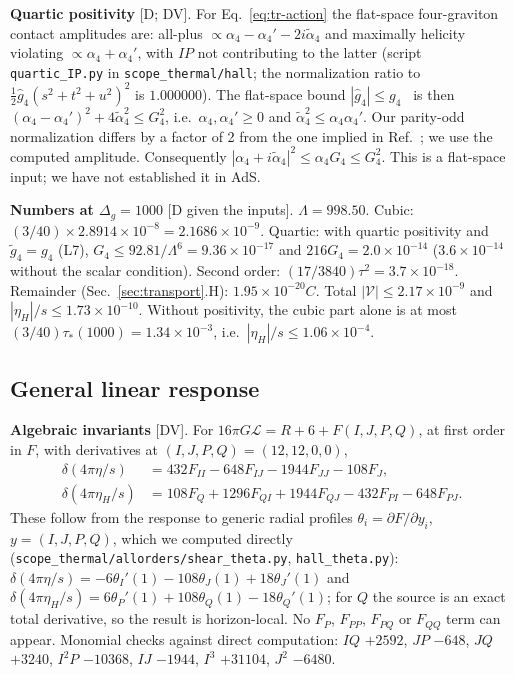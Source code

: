 \textbf{Quartic positivity} [D; DV]. For Eq.~\eqref{eq:tr-action} the flat-space four-graviton contact amplitudes are: all-plus
$\propto\alpha_4-\alpha_4'-2i\tilde\alpha_4$ and maximally helicity violating $\propto\alpha_4+\alpha_4'$, with $IP$ not
contributing to the latter (script \texttt{quartic\_IP.py} in \texttt{scope\_thermal/hall}; the normalization ratio to $\tfrac12\hat g_4(s^2+t^2+u^2)^2$
is $1.000000$). The flat-space bound $|\hat g_4|\le g_4$~\cite{CHLPS} is then $(\alpha_4-\alpha_4')^2+4\tilde\alpha_4^2\le G_4^2$,
i.e.\ $\alpha_4,\alpha_4'\ge0$ and $\tilde\alpha_4^2\le\alpha_4\alpha_4'$. Our parity-odd normalization differs by a factor of 2
from the one implied in Ref.~\cite{CHLPS}; we use the computed amplitude. Consequently $|\alpha_4+i\tilde\alpha_4|^2\le\alpha_4G_4\le G_4^2$.
This is a flat-space input; we have not established it in AdS.

\textbf{Numbers at $\Delta_g=1000$} [D given the inputs]. $\Lambda=998.50$. Cubic: $(3/40)\times2.8914\times10^{-8}=2.1686\times10^{-9}$.
Quartic: with quartic positivity and $\tilde g_4=g_4$ (L7), $G_4\le92.81/\Lambda^6=9.36\times10^{-17}$ and $216G_4=2.0\times10^{-14}$
($3.6\times10^{-14}$ without the scalar condition). Second order: $(17/3840)\tau^2=3.7\times10^{-18}$. Remainder (Sec.~\ref{sec:transport}.H):
$1.95\times10^{-20}C$. Total $|\mathcal V|\le2.17\times10^{-9}$ and $|\eta_H|/s\le1.73\times10^{-10}$. Without positivity, the cubic
part alone is at most $(3/40)\tau_*(1000)=1.34\times10^{-3}$, i.e.\ $|\eta_H|/s\le1.06\times10^{-4}$.

\subsection{General linear response}
\textbf{Algebraic invariants} [DV]. For $16\pi G\mathcal L=R+6+F(I,J,P,Q)$, at first order in $F$, with derivatives at
$(I,J,P,Q)=(12,12,0,0)$,
\begin{align}
\delta(4\pi\eta/s)&=432F_{II}-648F_{IJ}-1944F_{JJ}-108F_J,\\
\delta(4\pi\eta_H/s)&=108F_Q+1296F_{QI}+1944F_{QJ}-432F_{PI}-648F_{PJ}.
\end{align}
These follow from the response to generic radial profiles $\theta_i=\partial F/\partial y_i$, $y=(I,J,P,Q)$, which we computed
directly (\texttt{scope\_thermal/allorders/shear\_theta.py}, \texttt{hall\_theta.py}): $\delta(4\pi\eta/s)=-6\theta_I'(1)-108\theta_J(1)+18\theta_J'(1)$
and $\delta(4\pi\eta_H/s)=6\theta_P'(1)+108\theta_Q(1)-18\theta_Q'(1)$; for $Q$ the source is an exact total derivative, so the
result is horizon-local. No $F_P$, $F_{PP}$, $F_{PQ}$ or $F_{QQ}$ term can appear. Monomial checks against direct computation:
$IQ$ $+2592$, $JP$ $-648$, $JQ$ $+3240$, $I^2P$ $-10368$, $IJ$ $-1944$, $I^3$ $+31104$, $J^2$ $-6480$.

